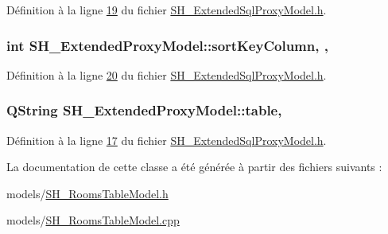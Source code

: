 Définition à la ligne \hyperlink{SH__ExtendedSqlProxyModel_8h_source_l00019}{19} du fichier \hyperlink{SH__ExtendedSqlProxyModel_8h_source}{S\-H\-\_\-\-Extended\-Sql\-Proxy\-Model.\-h}.

\hypertarget{classSH__ExtendedProxyModel_a47e2d0b99b84fb066438db667dd1ad26}{
\subsubsection[{sort\-Key\-Column}]{\setlength{\rightskip}{0pt plus 5cm}int S\-H\-\_\-\-Extended\-Proxy\-Model\-::sort\-Key\-Column\hspace{0.3cm}{\ttfamily [read]}, {\ttfamily [write]}, {\ttfamily [inherited]}}}\label{classSH__ExtendedProxyModel_a47e2d0b99b84fb066438db667dd1ad26}


Définition à la ligne \hyperlink{SH__ExtendedSqlProxyModel_8h_source_l00020}{20} du fichier \hyperlink{SH__ExtendedSqlProxyModel_8h_source}{S\-H\-\_\-\-Extended\-Sql\-Proxy\-Model.\-h}.

\hypertarget{classSH__ExtendedProxyModel_a7eef4557a77444e9ce5c24c180392bfa}{
\subsubsection[{table}]{\setlength{\rightskip}{0pt plus 5cm}Q\-String S\-H\-\_\-\-Extended\-Proxy\-Model\-::table\hspace{0.3cm}{\ttfamily [read]}, {\ttfamily [inherited]}}}\label{classSH__ExtendedProxyModel_a7eef4557a77444e9ce5c24c180392bfa}


Définition à la ligne \hyperlink{SH__ExtendedSqlProxyModel_8h_source_l00017}{17} du fichier \hyperlink{SH__ExtendedSqlProxyModel_8h_source}{S\-H\-\_\-\-Extended\-Sql\-Proxy\-Model.\-h}.



La documentation de cette classe a été générée à partir des fichiers suivants \-:\begin{DoxyCompactItemize}
\item 
models/\hyperlink{SH__RoomsTableModel_8h}{S\-H\-\_\-\-Rooms\-Table\-Model.\-h}\item 
models/\hyperlink{SH__RoomsTableModel_8cpp}{S\-H\-\_\-\-Rooms\-Table\-Model.\-cpp}\end{DoxyCompactItemize}
